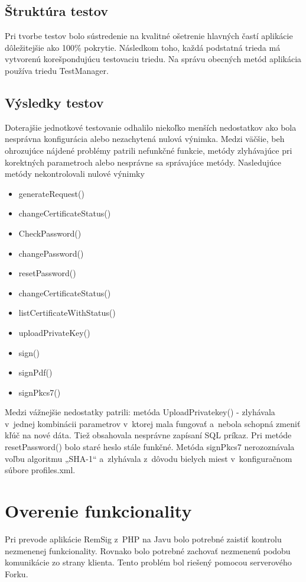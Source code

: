 \documentclass[
  printed, %
  notable,   %
  nolof,     %
    oneside,       %
  nolot,     %
]{fithesis3}
\begin{document}
\subsection{Štruktúra testov}
Pri tvorbe testov bolo sústredenie na kvalitné ošetrenie hlavných častí aplikácie dôležitejšie ako 100\% pokrytie. Následkom toho, každá podstatná trieda má vytvorenú korešpondujúcu testovaciu triedu. Na správu obecných metód aplikácia používa triedu TestManager. 

\subsection{Výsledky testov}
Doterajšie jednotkové testovanie odhalilo niekoľko menších nedostatkov ako bola nesprávna konfigurácia alebo nezachytená nulová výnimka. Medzi väčšie, beh ohrozujúce nájdené problémy patrili nefunkčné funkcie, metódy zlyhávajúce pri korektných parametroch alebo nesprávne sa správajúce metódy.  
Nasledujúce metódy nekontrolovali nulové výnimky 

\begin{itemize}

\item generateRequest()
\item changeCertificateStatus()
\item CheckPassword()
\item changePassword()
\item resetPassword()
\item changeCertificateStatus()
\item listCertificateWithStatus()
\item uploadPrivateKey()
\item sign()
\item signPdf()
\item signPkcs7()
 \end{itemize}


Medzi vážnejšie nedostatky patrili: metóda UploadPrivatekey() - zlyhávala v~jednej kombinácii parametrov v~ktorej mala fungovať a~nebola schopná zmeniť kľúč na nové dáta. Tiež obsahovala nesprávne zapísaní SQL príkaz. Pri metóde resetPassword() bolo staré heslo stále funkčné. Metóda signPkcs7 nerozoznávala voľbu algoritmu „SHA-1“ a~zlyhávala z~dôvodu bielych miest v~konfiguračnom súbore profiles.xml. 



\section{Overenie funkcionality}
Pri prevode aplikácie RemSig z~PHP na Javu bolo potrebné zaistiť kontrolu nezmenenej funkcionality.   Rovnako bolo potrebné zachovať nezmenenú podobu komunikácie zo strany klienta.  Tento problém bol riešený pomocou serverového Forku.
\end{document}
